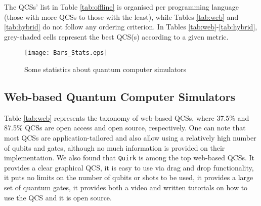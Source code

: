 \documentclass[conference]{IEEEtran}
\begin{document}
The QCSs' list in Table \ref{tab:offline} is organised per programming language (those with more QCSs to those with the least), while Tables \ref{tab:web} and \ref{tab:hybrid} do not follow any ordering criterion. In Tables \ref{tab:web}-\ref{tab:hybrid}, grey-shaded cells represent the best QCS(s) according to a given metric.  

\begin{figure*}\centering
	\texttt{[image: Bars\_Stats.eps]}
	\caption{Some statistics about quantum computer simulators \label{fig:stats}}
\end{figure*}

\subsection{Web-based Quantum Computer Simulators}
Table \ref{tab:web} represents the taxonomy of web-based QCSs, where 37.5\% and 87.5\% QCSs are open access and open source, respectively. One can note that most QCSs are application-tailored and also allow using a relatively high number of qubits and gates, although no much information is provided on their implementation. We also found that \texttt{Quirk} is among the top web-based QCSs. It provides a clear graphical QCS, it is easy to use via drag and drop functionality, it puts no limits on the number of qubits or shots to be used, it provides a large set of quantum gates, it provides both a video and written tutorials on how to use the QCS and it is open source. 
\end{document}
